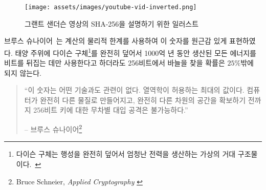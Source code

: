 \begin{comment}
\begin{figure}
  \texttt{[image: assets/images/youtube-vid-inverted.png]}
  \caption{Illustration of SHA-256 security. Original graphic by Grant Sanderson aka 3Blue1Brown.}
  \label{fig:youtube-vid-inverted}
\end{figure}
\end{comment}
\begin{figure}
	\texttt{[image: assets/images/youtube-vid-inverted.png]}
	\caption{그랜트 샌더슨 영상의 SHA-256을 설명하기 위한 일러스트}
	\label{fig:youtube-vid-inverted}
\end{figure}

\begin{comment}
Bruce Schneier~\cite{web:schneier} used the physical limits of computation to put this
number into perspective: even if we could build an optimal computer,
which would use any provided energy to flip bits perfectly~\cite{wiki:landauer}, build a
Dyson sphere\footnote{A Dyson sphere is a hypothetical megastructure that completely encompasses a star and captures a large percentage of its power output.~\cite{wiki:dyson}} around our sun, and let it run for 100 billion billion
years, we would still only have a $25\%$ chance to find a needle in a
256-bit haystack.
\end{comment}
브루스 슈나이어~\cite{web:schneier}는 계산의 물리적 한계를 사용하여 이 숫자를 원근감 있게 표현하였다.
태양 주위에 다이슨 구체\footnote{다이슨 구체는 행성을 완전히 덮어서 엄청난 전력을 생산하는 가상의 거대 구조물이다.~\cite{wiki:dyson}}를 완전히 덮어서 1000억 년 동안 생산된 모든 에너지를 비트를 뒤집는 데만 사용한다고 하더라도 256비트에서 바늘을 찾을 확률은 $25\%$밖에 되지 않는다.

\begin{comment}
\begin{quotation}\begin{samepage}
\enquote{These numbers have nothing to do with the technology of the devices;
they are the maximums that thermodynamics will allow. And they
strongly imply that brute-force attacks against 256-bit keys will be
infeasible until computers are built from something other than matter
and occupy something other than space.}
\begin{flushright} -- Bruce Schneier\footnote{Bruce Schneier, \textit{Applied Cryptography} \cite{bruce-schneier}}
\end{flushright}\end{samepage}\end{quotation}
\end{comment}
\begin{quotation}\begin{samepage}
		\enquote{이 숫자는 어떤 기술과도 관련이 없다. 
			열역학이 허용하는 최대의 값이다.
			컴퓨터가 완전히 다른 물질로 만들어지고, 
			완전히 다른 차원의 공간을 확보하기 전까지 
			256비트 키에 대한 무차별 대입 공격은 불가능하다.}
		\begin{flushright} -- 브루스 슈나이어\footnote{Bruce Schneier, \textit{Applied Cryptography} \cite{bruce-schneier}}
\end{flushright}\end{samepage}\end{quotation}

